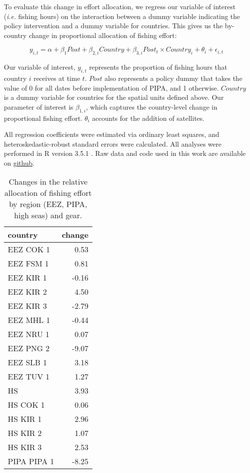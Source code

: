 \documentclass[11pt,]{article}
\begin{document}
To evaluate this change in effort allocation, we regress our variable of
interest (\emph{i.e.} fishing hours) on the interaction between a dummy
variable indicating the policy intervention and a dummy variable for
countries. This gives us the by-country change in proportional
allocation of fishing effort:

\[
y_{i,t} = \alpha + \beta_1Post + \beta_{2,i}Country + \beta_{3,i}Post_t \times Country_i + \theta_i + \epsilon_{i,t}
\]

Our variable of interest, \(y_{i,t}\) represents the proportion of
fishing hours that country \(i\) receives at time \(t\). \(Post\) also
represents a policy dummy that takes the value of 0 for all dates before
implementation of PIPA, and 1 otherwise. \(Country\) is a dummy variable
for countries for the spatial units defined above. Our parameter of
interest is \(\beta_{1,i}\), which captures the country-level change in
proportional fishing effort. \(\theta_i\) accounts for the addition of
satellites.

All regression coefficients were estimated via ordinary least squares,
and heteroskedastic-robust standard errors were calculated. All analyses
were performed in R version 3.5.1 \citep{rcore_2018}. Raw data and code
used in this work are available on
\href{https://github.com/jcvdav/MPA_displacement}{github}.

\begin{table}[H]

\caption{\label{tab:unnamed-chunk-10}\label{tab:ba_disp}Changes in the relative allocation of fishing effort by region (EEZ, PIPA, high seas) and gear.}
\centering
\begin{tabular}[t]{lr}
\toprule
country & change\\
\midrule
EEZ COK 1 & 0.53\\
EEZ FSM 1 & 0.81\\
EEZ KIR 1 & -0.16\\
EEZ KIR 2 & 4.50\\
EEZ KIR 3 & -2.79\\
\addlinespace
EEZ MHL 1 & -0.44\\
EEZ NRU 1 & 0.07\\
EEZ PNG 2 & -9.07\\
EEZ SLB 1 & 3.18\\
EEZ TUV 1 & 1.27\\
\addlinespace
HS & 3.93\\
HS COK 1 & 0.06\\
HS KIR 1 & 2.96\\
HS KIR 2 & 1.07\\
HS KIR 3 & 2.53\\
PIPA PIPA 1 & -8.25\\
\bottomrule
\end{tabular}
\end{table}
\end{document}
